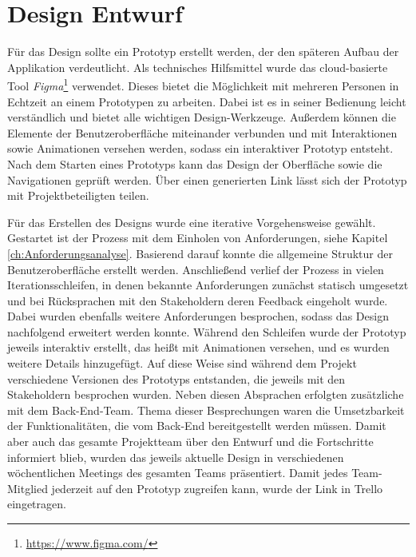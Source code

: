 
\section{Design Entwurf}\label{ch:DesignEntwurf}

Für das Design sollte ein Prototyp erstellt werden, der den späteren Aufbau der Applikation verdeutlicht.
Als technisches Hilfsmittel wurde das cloud-basierte Tool \textit{Figma}\footnote{\url{https://www.figma.com/}} verwendet.
Dieses bietet die Möglichkeit mit mehreren Personen in Echtzeit an einem Prototypen zu arbeiten.
Dabei ist es in seiner Bedienung leicht verständlich und bietet alle wichtigen Design-Werkzeuge. 
Außerdem können die Elemente der Benutzeroberfläche miteinander verbunden und mit Interaktionen sowie Animationen versehen werden, sodass ein interaktiver Prototyp entsteht.
Nach dem Starten eines Prototyps kann das Design der Oberfläche sowie die Navigationen geprüft werden.
Über einen generierten Link lässt sich der Prototyp mit Projektbeteiligten teilen. 

Für das Erstellen des Designs wurde eine iterative Vorgehensweise gewählt.  
Gestartet ist der Prozess mit dem Einholen von Anforderungen, siehe Kapitel \vref{ch:Anforderungsanalyse}.
Basierend darauf konnte die allgemeine Struktur der Benutzeroberfläche erstellt werden.
Anschließend verlief der Prozess in vielen Iterationsschleifen, in denen bekannte Anforderungen zunächst statisch umgesetzt und bei Rücksprachen mit den Stakeholdern deren Feedback eingeholt wurde.
Dabei wurden ebenfalls weitere Anforderungen besprochen, sodass das Design nachfolgend erweitert werden konnte.
Während den Schleifen wurde der Prototyp jeweils interaktiv erstellt, das heißt mit Animationen versehen, und es wurden weitere Details hinzugefügt.
Auf diese Weise sind während dem Projekt verschiedene Versionen des Prototyps entstanden, die jeweils mit den Stakeholdern besprochen wurden.
Neben diesen Absprachen erfolgten zusätzliche mit dem Back-End-Team.
Thema dieser Besprechungen waren die Umsetzbarkeit der Funktionalitäten, die vom Back-End bereitgestellt werden müssen.
Damit aber auch das gesamte Projektteam über den Entwurf und die Fortschritte informiert blieb, wurden das jeweils aktuelle Design in verschiedenen wöchentlichen Meetings des gesamten Teams präsentiert.
Damit jedes Team-Mitglied jederzeit auf den Prototyp zugreifen kann, wurde der Link in Trello eingetragen. 

